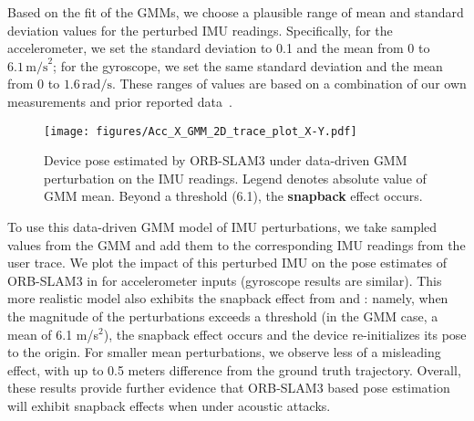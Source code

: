 Based on the fit of the GMMs, we choose a plausible range of mean and standard deviation values for the perturbed IMU readings.
Specifically, for the accelerometer, we set the standard deviation to 0.1 and the mean from 0 to $6.1\,\text{m/s}^2$; for the gyroscope, we set the same standard deviation and the mean from 0 to $1.6 \,\text{rad/s}$.
These ranges of values are based on a combination of our own measurements and prior reported data~\cite{jeong2023rocking}.


\begin{figure}[h]
    \centering
    \texttt{[image: figures/Acc\_X\_GMM\_2D\_trace\_plot\_X-Y.pdf]}
    \caption{
    Device pose estimated by ORB-SLAM3 under data-driven GMM perturbation on the IMU readings.
    Legend denotes absolute value of GMM mean.
    Beyond a threshold (6.1), the \textbf{snapback} effect occurs.}
    \label{fig:orbslam_acc_gmm}
\end{figure}


To use this data-driven GMM model of IMU perturbations, 
we take sampled values from the GMM and add them to the corresponding IMU readings from the user trace.
We plot the impact of this perturbed IMU on the pose estimates of ORB-SLAM3 in  for accelerometer inputs (gyroscope results are similar).
This more realistic model also exhibits the snapback effect from  and : namely, when the magnitude of the perturbations exceeds a threshold (in the GMM case, a mean of 6.1 m/s$^2$), the snapback effect occurs and the device re-initializes its pose to the origin.
For smaller mean perturbations, we observe less of a misleading effect, with up to 0.5 meters difference from the ground truth trajectory.
Overall, these results provide further evidence that ORB-SLAM3 based pose estimation will exhibit snapback effects when under acoustic attacks.





